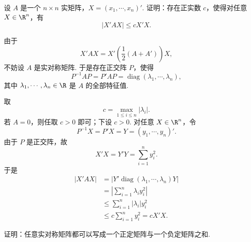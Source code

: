 \begin{problem}
	设 $A$ 是一个 $n\times n$ 实矩阵，$X=(x_1,\cdots,x_n)'$. 证明：存在正实数 $c$，使得对任意 $X\in\R^n$，有
	\[
	|X'AX|\le cX'X.
	\]
\end{problem}

\begin{solution}
	由于
	\[
	X'AX=X'\left(\frac12(A+A')\right)X,
	\]
	不妨设 $A$ 是实对称矩阵. 于是存在正交阵 $P$，使得
	\[
	P^{-1}AP=P'AP=\operatorname{diag}(\lambda_1,\cdots,\lambda_n),
	\]
	其中 $\lambda_1,\cdots,\lambda_n\in\R$ 是 $A$ 的全部特征值.
	
	取
	\[
	c=\max_{1\le i\le n}|\lambda_i|.
	\]
	若 $A=0$，则任取 $c>0$ 即可；下设 $c>0$. 对任意 $X\in\R^n$，令
	\[
	P^{-1}X=P'X=Y=(y_1,\cdots,y_n)'.
	\]
	由于 $P$ 是正交阵，故
	\[
	X'X=Y'Y=\sum_{i=1}^n y_i^2.
	\]
	于是
	\[
	\begin{aligned}
		|X'AX|
		&=\left|Y'\operatorname{diag}(\lambda_1,\cdots,\lambda_n)Y\right| \\
		&=\left|\sum_{i=1}^n \lambda_i y_i^2\right| \\
		&\le \sum_{i=1}^n |\lambda_i|y_i^2 \\
		&\le c\sum_{i=1}^n y_i^2
		=cX'X.
	\end{aligned}
	\]
\end{solution}

\begin{problem}

	证明：任意实对称矩阵都可以写成一个正定矩阵与一个负定矩阵之和.
\end{problem}

